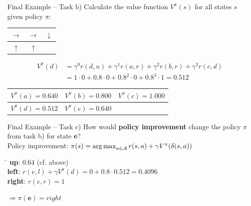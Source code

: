 \begin{frame}{Final Example -- Task b)}{}
	Calculate the value function $V^{\pi}(s)$ for all states $s$ given policy $\pi$:

	\begin{table}
		\centering
		\begin{tabular}{| c | c | c |}
			\hline
			$\rightarrow$ 	& 	$\rightarrow$ 	& 	$\downarrow$ 	\\ \hline
			$\uparrow$ 	& 	$\uparrow$ 	& 				\\ \hline
		\end{tabular}
	\end{table}

	\vspace*{-3mm}
	\begin{align*}
		V^{\pi}(d) 	&= \gamma^0 r(d, u) + \gamma^1 r(a, r) + \gamma^2 r(b, r) + \gamma^3 r(c,d) \\
					&= 1 \cdot 0 + 0.8 \cdot 0 + 0.8^2 \cdot 0 + 0.8^3 \cdot 1 = \bm{0.512}
	\end{align*}

	\vspace*{-4mm}
	\begin{table}
		\centering
		\begin{tabular}{| c | c | c |}
			\hline
			$V^{\pi}(a) = 0.640$		& 	$V^{\pi}(b) = 0.800$ 	&	$V^{\pi}(c) = 1.000$ 	\\ \hline
			$V^{\pi}(d) = 0.512$		&	$V^{\pi}(e) = 0.640$		&				\\ \hline
		\end{tabular}
	\end{table}
\end{frame}


\begin{frame}{Final Example -- Task c)}{}
	How would \textbf{policy improvement} change the policy $\pi$ from task b) for state \textbf{e}? \\[5mm]

	Policy improvement: $\pi(s) = \operatorname*{arg\,max}_{a \in \mathcal{A}} r(s, a) + \gamma V^{\pi}(\delta(s, a))$
	
	\begin{tabbing}
		\hspace*{1.5cm}\= \kill
		\textbf{up}:		\>	$0.64$ (cf. above) \\
		\textbf{left}: 		\>	$r(e, l) + \gamma V^{\pi}(d) = 0 + 0.8 \cdot 0.512 = 0.4096$ \\
		\textbf{right}: 		\>	$r(e, r) = 1$ 	
	\end{tabbing}

	$\Rightarrow \pi(\bm{e}) = right$
\end{frame}


